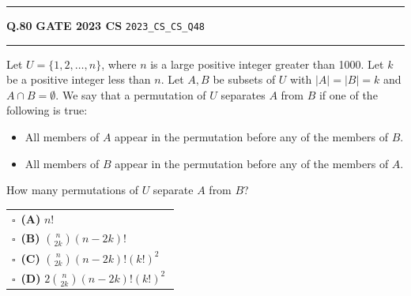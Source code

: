 \documentclass[a4paper,10pt]{article}
\begin{document}
\vspace{6pt}\hrule height 0.35pt\vspace{6pt}
\noindent
\begin{tcolorbox}[
    blanker,
    sidebyside,
    sidebyside align=top,
    lefthand width=0.55\textwidth,
    top=4pt, bottom=4pt, left=0pt, right=0pt,
    middle=16pt,
    underlay={
        \draw[dashed, black!80, line width=0.8pt, dash pattern=on 4pt off 3pt]
            ([xshift=0.55\textwidth+8pt]frame.north west) --
            ([xshift=0.55\textwidth+8pt]frame.south west);
    }
]
\textbf{Q.80}  \hfill {\footnotesize\textbf{GATE 2023 CS} \quad \tiny\texttt{2023\_CS\_CS\_Q48}}
\vspace{2pt}\hrule height 0.3pt\vspace{4pt}

Let $U = \{1, 2, \dots, n\}$, where $n$ is a large positive integer greater than 1000. Let $k$ be a positive integer less than $n$. Let $A, B$ be subsets of $U$ with $|A| = |B| = k$ and $A \cap B = \emptyset$. We say that a permutation of $U$ separates $A$ from $B$ if one of the following is true:
\begin{itemize}[itemsep=0pt,topsep=2pt]
\item All members of $A$ appear in the permutation before any of the members of $B$.
\item All members of $B$ appear in the permutation before any of the members of $A$.
\end{itemize}
How many permutations of $U$ separate $A$ from $B$?

\par\vspace{6pt}\noindent
\begin{tabular}{@{}p{0.98\linewidth}@{}}
$\square$\ \textbf{(A)} $n!$ \\
\addlinespace[3pt]
$\square$\ \textbf{(B)} $\binom{n}{2k} (n - 2k)!$ \\
\addlinespace[3pt]
$\square$\ \textbf{(C)} $\binom{n}{2k} (n - 2k)! (k!)^2$ \\
\addlinespace[3pt]
$\square$\ \textbf{(D)} $2 \binom{n}{2k} (n - 2k)! (k!)^2$
\end{tabular}

\tcblower


\end{tcolorbox}
\end{document}
